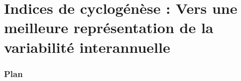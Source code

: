 \documentclass[aspectratio=169, usepdftitle=false, xcolor={dvipsnames}, 9pt,table]{beamer}
\begin{document}
\section[Indices de cyclogénèse]{Indices de cyclogénèse : Vers une meilleure représentation de la variabilité interannuelle}
%
\begin{frame}[c]
    \frametitle{Plan}
    \addtocounter{framesinsection}{-1}
\end{frame}


\end{document}
